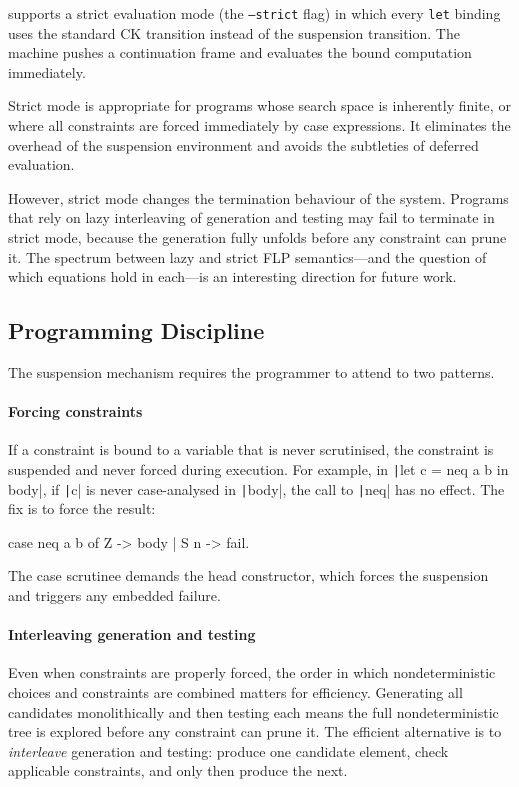 \Gweek{} supports a strict evaluation mode (the \texttt{--strict} flag) in
which every \texttt{let} binding uses the standard CK transition instead of the
suspension transition. The machine pushes a continuation frame and evaluates the
bound computation immediately.

Strict mode is appropriate for programs whose search space is inherently
finite, or where all constraints are forced immediately by case expressions. It
eliminates the overhead of the suspension environment and avoids the subtleties
of deferred evaluation.

However, strict mode changes the termination behaviour of the system. Programs
that rely on lazy interleaving of generation and testing may fail to terminate
in strict mode, because the generation fully unfolds before any constraint can
prune it. The spectrum between lazy and strict FLP semantics---and the question
of which equations hold in each---is an interesting direction for future work.

\subsection{Programming Discipline}

The suspension mechanism requires the programmer to attend to two patterns.

\paragraph{Forcing constraints}
If a constraint is bound to a variable that is never scrutinised, the
constraint is suspended and never forced during execution. For example, in
\texttt|let c = neq a b in body|, if \texttt|c| is
never case-analysed in \texttt|body|, the call to
\texttt|neq| has no effect. The fix is to force the result:
%
\begin{haskellcode}
case neq a b of
    Z -> body
  | S n -> fail.
\end{haskellcode}
%
\noindent The case scrutinee demands the head constructor, which forces the
suspension and triggers any embedded failure.

\paragraph{Interleaving generation and testing}
Even when constraints are properly forced, the order in which nondeterministic
choices and constraints are combined matters for efficiency. Generating all
candidates monolithically and then testing each means the full nondeterministic
tree is explored before any constraint can prune it. The efficient alternative
is to \emph{interleave} generation and testing: produce one candidate element,
check applicable constraints, and only then produce the next.
